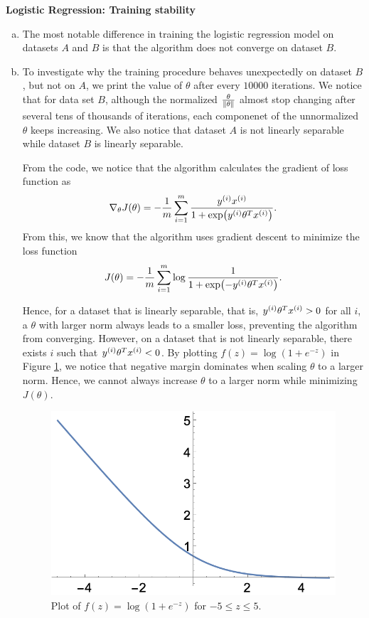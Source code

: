 \documentclass[12pt,letterpaper,boxed]{hmcpset}
\begin{document}

\begin{problem}[Problem 1]
\textbf{Logistic Regression: Training stability}
\end{problem}

\begin{solution}
  \begin{enumerate}[(a)]
    \item The most notable difference in training the logistic regression model on datasets $A$ and $B$ is that the algorithm does not converge on dataset $B$.
    
    \item To investigate why the training procedure behaves unexpectedly on dataset $B$, but not on $A$, we print the value of $\theta$ after every $10000$ iterations. We notice that for data set $B$, although the normalized $\frac{\theta}{\left\lVert \theta\right\rVert}$ almost stop changing after several tens of thousands of iterations, each componenet of the unnormalized $\theta$ keeps increasing. We also notice that dataset $A$ is not linearly separable while dataset $B$ is linearly separable.
    
    From the code, we notice that the algorithm calculates the gradient of loss function as 
    \[
    \nabla_{\theta} J(\theta) = -\frac{1}{m} \sum_{i=1}^m \frac{ \yy \xx}{1+ \exp(\yy \theta^T \xx)}.
    \]
    From this, we know that the algorithm uses gradient descent to minimize the loss function
    \[
    J(\theta) = - \frac{1}{m} \sum_{i=1}^m \log \frac{1}{1+ \exp(-\yy \theta^T \xx)}.
    \]

    Hence, for a dataset that is linearly separable, that is, $\yy \theta^T \xx > 0$ for all $i$, a $\theta$ with larger norm always leads to a smaller loss, preventing the algorithm from converging. However, on a dataset that is not linearly separable, there exists $i$ such that $\yy \theta^T \xx < 0$. By plotting $f(z) = \log (1+e^{-z})$ in Figure \ref{fz}, we notice that negative margin dominates when scaling $\theta$ to a larger norm. Hence, we cannot always increase $\theta$ to a larger norm while minimizing $J(\theta)$.

    \begin{figure}
      \centering
      \includegraphics[width=0.6\linewidth]{fz.png}
      \caption{Plot of $f(z) = \log (1+e^{-z})$ for $-5 \leq z \leq 5$.}
      \label{fz}
    \end{figure}
    

\end{enumerate}
\end{solution}
\end{document}
